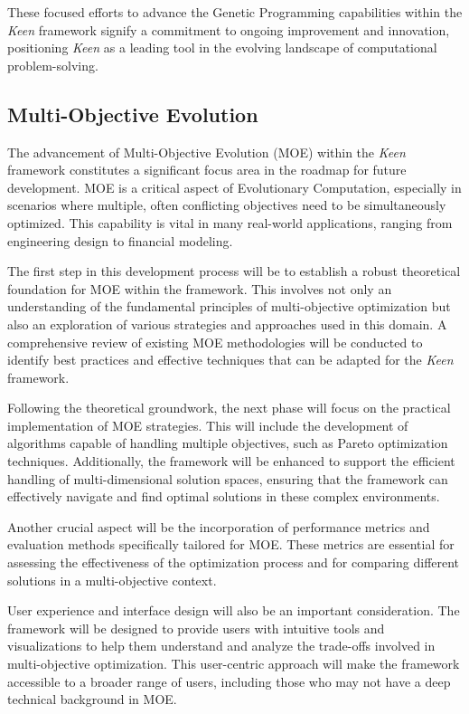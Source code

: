             These focused efforts to advance the Genetic Programming capabilities within the \textit{Keen} framework 
            signify a commitment to ongoing improvement and innovation, positioning \textit{Keen} as a leading tool in 
            the evolving landscape of computational problem-solving.

    \subsection{Multi-Objective Evolution}
    \label{sec:future:moe}
        The advancement of Multi-Objective Evolution (MOE) within the \textit{Keen} framework constitutes a significant 
        focus area in the roadmap for future development. MOE is a critical aspect of Evolutionary Computation, 
        especially in scenarios where multiple, often conflicting objectives need to be simultaneously optimized. This 
        capability is vital in many real-world applications, ranging from engineering design to financial modeling.

        The first step in this development process will be to establish a robust theoretical foundation for MOE within 
        the framework. This involves not only an understanding of the fundamental principles of multi-objective 
        optimization but also an exploration of various strategies and approaches used in this domain. A comprehensive 
        review of existing MOE methodologies will be conducted to identify best practices and effective techniques that 
        can be adapted for the \textit{Keen} framework.

        Following the theoretical groundwork, the next phase will focus on the practical implementation of MOE 
        strategies. This will include the development of algorithms capable of handling multiple objectives, such as 
        Pareto optimization techniques. Additionally, the framework will be enhanced to support the efficient handling 
        of multi-dimensional solution spaces, ensuring that the framework can effectively navigate and find optimal 
        solutions in these complex environments.

        Another crucial aspect will be the incorporation of performance metrics and evaluation methods specifically 
        tailored for MOE. These metrics are essential for assessing the effectiveness of the optimization process and 
        for comparing different solutions in a multi-objective context.

        User experience and interface design will also be an important consideration. The framework will be designed to 
        provide users with intuitive tools and visualizations to help them understand and analyze the trade-offs 
        involved in multi-objective optimization. This user-centric approach will make the framework accessible to a 
        broader range of users, including those who may not have a deep technical background in MOE.

